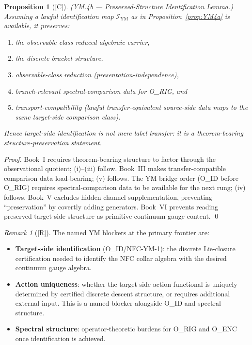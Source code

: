 \documentclass[12pt,oneside]{amsbook}
\theoremstyle{plain}
\newtheorem{proposition}[theorem]{Proposition}
\theoremstyle{definition}
\theoremstyle{remark}
\newtheorem{remark}[theorem]{Remark}
\newcommand{\status}[1]{\textup{[#1]}}
\begin{document}
\begin{proposition}[\status{C}]\label{prop:YM4b}
\textup{(YM.4b --- Preserved-Structure Identification Lemma.)}
Assuming a lawful identification map $\mathcal{I}_{\mathrm{YM}}$ as
in Proposition~\ref{prop:YM4a} is available, it preserves:
\begin{enumerate}[label=\textup{(\roman*)}]
 \item the observable-class-reduced algebraic carrier,
 \item the discrete bracket structure,
 \item observable-class reduction (presentation-independence),
 \item branch-relevant spectral-comparison data for O\_RIG, and
 \item transport-compatibility (lawful transfer-equivalent
 source-side data maps to the same target-side comparison class).
\end{enumerate}
Hence target-side identification is not mere label transfer: it is
a theorem-bearing structure-preservation statement.
\end{proposition}

\begin{proof}
Book~I requires theorem-bearing structure to factor through the
observational quotient; (i)--(iii) follow. Book~III makes
transfer-compatible comparison data load-bearing; (v) follows.
The YM bridge order (O\_ID before O\_RIG) requires spectral-comparison
data to be available for the next rung; (iv) follows. Book~V
excludes hidden-channel supplementation, preventing ``preservation''
by covertly adding generators. Book~VI prevents reading preserved
target-side structure as primitive continuum gauge content. \qed
\end{proof}

\begin{remark}[\status{R}]
The named YM blockers at the primary frontier are:
\begin{itemize}
\item \textbf{Target-side identification} (O\_ID/NFC-YM-1):
 the discrete Lie-closure certification needed to identify the
 NFC collar algebra with the desired continuum gauge algebra.
\item \textbf{Action uniqueness}: whether the target-side action
 functional is uniquely determined by certified discrete descent
 structure, or requires additional external input. This is a
 named blocker alongside O\_ID and spectral structure.
\item \textbf{Spectral structure}: operator-theoretic burdens for
 O\_RIG and O\_ENC once identification is achieved.
\end{itemize}
\end{remark}
\end{document}
